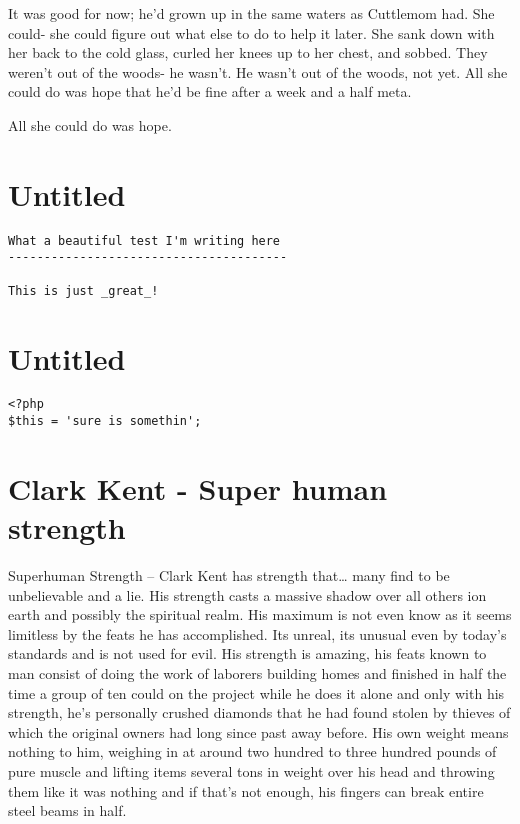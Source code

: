 \documentclass[a1paper]{article}
\begin{document}
\begin{multicols}{7}
{It was good for now; he'd grown up in the same waters as Cuttlemom had.  She could- she could figure out what else to do to help it later.  She sank down with her back to the cold glass, curled her knees up to her chest, and sobbed.  They weren't out of the woods- he wasn't.  He wasn't out of the woods, not yet.  All she could do was hope that he'd be fine after a week and a half meta.

All she could do was hope.





\section{Untitled}
\begin{verbatim}
What a beautiful test I'm writing here
---------------------------------------

This is just _great_!
\end{verbatim}



\section{Untitled}
\begin{verbatim}
<?php
$this = 'sure is somethin';
\end{verbatim}






\section{Clark Kent - Super human strength}
Superhuman Strength – Clark Kent has strength that… many find to be unbelievable and a lie. His strength casts a massive shadow over all others ion earth and possibly the spiritual realm. His maximum is not even know as it seems limitless by the feats he has accomplished. Its unreal, its unusual even by today’s standards and is not used for evil. His strength is amazing, his feats known to man consist of doing the work of laborers building homes and finished in half the time a group of ten could on the project while he does it alone and only with his strength, he’s personally crushed diamonds that he had found stolen by thieves of which the original owners had long since past away before. His own weight means nothing to him, weighing in at around two hundred to three hundred pounds of pure muscle and lifting items several tons in weight over his head and throwing them like it was nothing and if that’s not enough, his fingers can break entire steel beams in half. 

}
\end{multicols}
\end{document}
